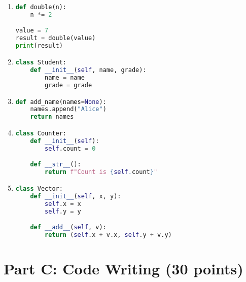 \documentclass[11pt]{article}
\begin{document}
\begin{enumerate}[label=\arabic*.]
    \item \begin{lstlisting}[language=Python]
def double(n):
    n *= 2

value = 7
result = double(value)
print(result)
    \end{lstlisting}

    \item \begin{lstlisting}[language=Python]
class Student:
    def __init__(self, name, grade):
        name = name
        grade = grade
    \end{lstlisting}

    \item \begin{lstlisting}[language=Python]
def add_name(names=None):
    names.append("Alice")
    return names
    \end{lstlisting}

    \item \begin{lstlisting}[language=Python]
class Counter:
    def __init__(self):
        self.count = 0

    def __str__():
        return f"Count is {self.count}"
    \end{lstlisting}

    \item \begin{lstlisting}[language=Python]
class Vector:
    def __init__(self, x, y):
        self.x = x
        self.y = y

    def __add__(self, v):
        return (self.x + v.x, self.y + v.y)
    \end{lstlisting}
\end{enumerate}

\newpage

\section*{Part C: Code Writing (30 points)}
\end{document}
